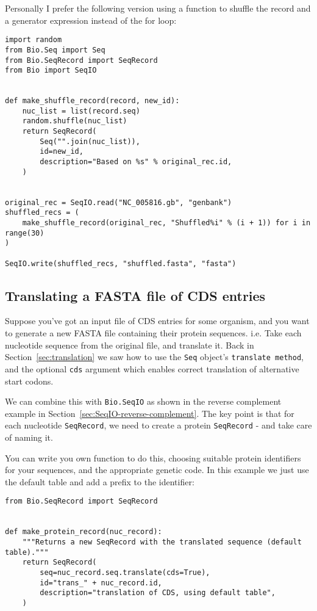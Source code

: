 Personally I prefer the following version using a function to shuffle the record
and a generator expression instead of the for loop:

\begin{verbatim}
import random
from Bio.Seq import Seq
from Bio.SeqRecord import SeqRecord
from Bio import SeqIO


def make_shuffle_record(record, new_id):
    nuc_list = list(record.seq)
    random.shuffle(nuc_list)
    return SeqRecord(
        Seq("".join(nuc_list)),
        id=new_id,
        description="Based on %s" % original_rec.id,
    )


original_rec = SeqIO.read("NC_005816.gb", "genbank")
shuffled_recs = (
    make_shuffle_record(original_rec, "Shuffled%i" % (i + 1)) for i in range(30)
)

SeqIO.write(shuffled_recs, "shuffled.fasta", "fasta")
\end{verbatim}

\subsection{Translating a FASTA file of CDS entries}
\label{sec:SeqIO-translate}
Suppose you've got an input file of CDS entries for some organism, and you
want to generate a new FASTA file containing their protein sequences.  i.e.
Take each nucleotide sequence from the original file, and translate it.
Back in Section~\ref{sec:translation} we saw how to use the \verb|Seq|
object's \verb|translate method|, and the optional \verb|cds| argument
which enables correct translation of alternative start codons.

We can combine this with \verb|Bio.SeqIO| as
shown in the reverse complement example in Section~\ref{sec:SeqIO-reverse-complement}.
The key point is that for each nucleotide \verb|SeqRecord|, we need to create
a protein \verb|SeqRecord| - and take care of naming it.

You can write you own function to do this, choosing suitable protein identifiers
for your sequences, and the appropriate genetic code.  In this example we just
use the default table and add a prefix to the identifier:

\begin{verbatim}
from Bio.SeqRecord import SeqRecord


def make_protein_record(nuc_record):
    """Returns a new SeqRecord with the translated sequence (default table)."""
    return SeqRecord(
        seq=nuc_record.seq.translate(cds=True),
        id="trans_" + nuc_record.id,
        description="translation of CDS, using default table",
    )
\end{verbatim}

